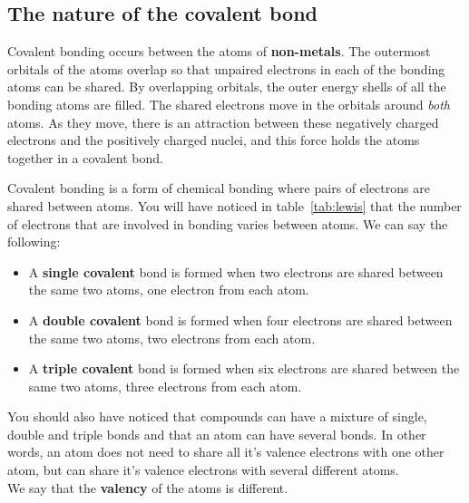             \subsection*{The nature of the covalent bond}
            \nopagebreak
        \label{m38704*id138956}Covalent bonding occurs between the atoms of \textbf{non-metals}. The outermost orbitals of the atoms overlap so that unpaired electrons in each of the bonding atoms can be shared. By overlapping orbitals, the outer energy shells of all the bonding atoms are filled. The shared electrons move in the orbitals around \textsl{both} atoms. As they move, there is an attraction between these negatively charged electrons and the positively charged nuclei, and this force holds the atoms together in a covalent bond.\par 
\label{m38704*fhsst!!!underscore!!!id94}
 { \label{m38704*meaningfhsst!!!underscore!!!id94}
Covalent bonding is a form of chemical bonding where pairs of electrons are shared between atoms.} 
\label{m38704*id139505}You will have noticed in table~\ref{tab:lewis} that the number of electrons that are involved in bonding varies between atoms.
 We can say the following:
\begin{itemize}
 \item A \textbf{single covalent} bond is formed when two electrons are shared between the same two atoms, one electron from each atom. 
 \item A \textbf{double covalent} bond is formed when four electrons are shared between the same two atoms, two electrons from each atom.
 \item A \textbf{triple covalent} bond is formed when six electrons are shared between the same two atoms, three electrons from each atom.
\end{itemize}
You should also have noticed that compounds can have a mixture of single, double and triple bonds and that an atom can have several bonds. In other words, an atom does not need to share all it's valence electrons with one other atom, but can share it's valence electrons with several different atoms.\\
We say that the \textbf{valency} of the atoms is different. 

